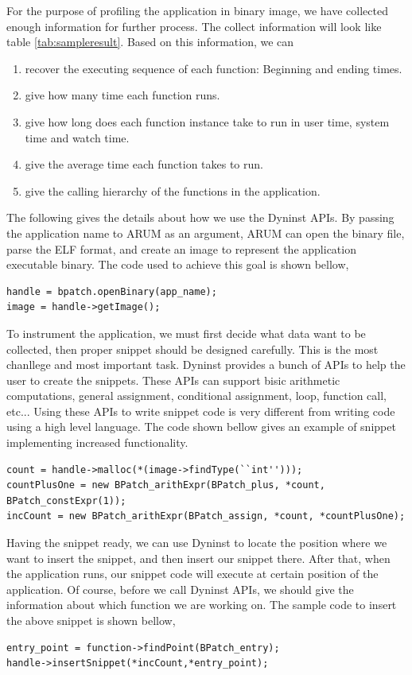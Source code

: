 \documentclass[11pt,letterpaper,oneside]{article}
\begin{document}
For the purpose of profiling the application in binary image, we have collected enough information for further process. The collect information will look like table \ref{tab:sampleresult}. Based on this information, we can
\begin{enumerate}
\item recover the executing sequence of each function: Beginning and ending times.
\item give how many time each function runs.
\item give how long does each function instance take to run in user time, system time and watch time.
\item give the average time each function takes to run.
\item give the calling hierarchy of the functions in the application.
\end{enumerate}

The following gives the details about how we use the Dyninst APIs. By passing the application name to ARUM as an argument, ARUM can open the binary file, parse the ELF format, and create an image to represent the application executable binary. The code used to achieve this goal is shown bellow,
\begin{Verbatim}[frame=single]
handle = bpatch.openBinary(app_name);
image = handle->getImage();
\end{Verbatim}

To instrument the application, we must first decide what data want to be collected, then proper snippet should be designed carefully. This is the most chanllege and most important task. Dyninst provides a bunch of APIs to help the user to create the snippets. These APIs can support bisic arithmetic computations, general assignment, conditional assignment, loop, function call, etc... Using these APIs to write snippet code is very different from writing code using a high level language. The code shown bellow gives an example of snippet implementing increased functionality.
\begin{Verbatim}[frame=single]
count = handle->malloc(*(image->findType(``int'')));
countPlusOne = new BPatch_arithExpr(BPatch_plus, *count, BPatch_constExpr(1));
incCount = new BPatch_arithExpr(BPatch_assign, *count, *countPlusOne);
\end{Verbatim}

Having the snippet ready, we can use Dyninst to locate the position where we want to insert the snippet, and then insert our snippet there. After that, when the application runs, our snippet code will execute at certain position of the application. Of course, before we call Dyninst APIs, we should give the information about which function we are working on. The sample code to insert the above snippet is shown bellow,
\begin{Verbatim}[frame=single]
entry_point = function->findPoint(BPatch_entry);
handle->insertSnippet(*incCount,*entry_point);
\end{Verbatim}
\end{document}
